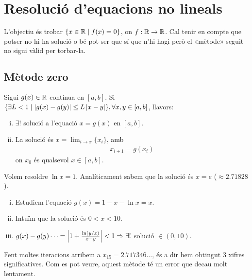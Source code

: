 \section{Resolució d'equacions no lineals}
L'objectiu és trobar $\{ x \in \mathbb{R} \mid f(x) = 0 \}$, on $f: \mathbb{R} \to \mathbb{R}$.
Cal tenir en compte que potser no hi ha solució o bé pot ser que sí que n'hi hagi però el «mètode» seguit no sigui vàlid per torbar-la.

\subsection{Mètode zero}
\begin{thm}
    Sigui $g(x) \in \mathbb{R}$ contínua en $[a,b]$. Si $\{ \exists L < 1 \mid \left| g(x) - g(y) \right| \leq L \left| x-y \right| \}, \forall x,y \in [a,b]$, llavors:
    \begin{enumerate}[i)]
        \item $\exists!$ solució a l'equació $x = g(x)$ en $[a,b]$.
        \item La solució és $x = \lim_{i \to x} \{ x_{i} \}$, amb
        \begin{align}
            \boxed{x_{i+1} = g(x_{i})}
        \end{align}
        on $x_{0}$ és qualsevol $x \in [a,b]$.
    \end{enumerate}
\end{thm}

\begin{example}
    Volem resoldre $\ln x = 1$. Analíticament sabem que la solució és $x = e$ ($\approx \num{2.71828}$).
    \begin{enumerate}[i)]
        \item Estudiem l'equació $g(x) = 1 - x - \ln x = x$.
        \item Intuïm que la solució és $0 < x < 10$.
        \item $g(x) - g(y) \dots = \left| 1 + \frac{\ln (y/x)}{x-y} \right| < 1 \Rightarrow \exists!$ solució $\in (0,10)$.
    \end{enumerate}
    Fent moltes iteracions arribem a $x_{15} = \num{2.717346}\dots$, és a dir hem obtingut 3 xifres significatives. Com es pot veure, aquest mètode té un error que decau molt lentament.
\end{example}



